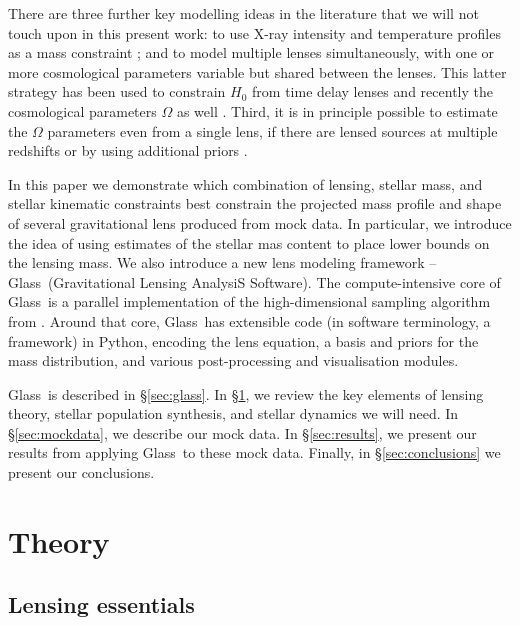 \documentclass[galley,usenatbib]{mn2e}
\newcommand{\Glass}{{\sc Glass}}
\newcommand{\secref}[1] {\S\ref{#1}}
\begin{document}
There are three further key modelling ideas in the literature that we will not
touch upon in this present work: to use X-ray intensity and temperature
profiles as a mass constraint \citep[e.g.][]{2013ApJ...765...25N}; and to model
multiple lenses simultaneously, with one or more cosmological parameters
variable but shared between the lenses. This latter strategy has been used to
constrain $H_0$ from time delay lenses
\citep{2006ApJ...652L...5S,2008ApJ...679...17C,2010ApJ...712.1378P} and
recently the cosmological parameters $\Omega$ as well
\citep{2014MNRAS.437..600S}.  Third, it is in principle possible to estimate
the $\Omega$ parameters even from a single lens, if there are lensed sources at
multiple redshifts \citep{2014MNRAS.437.2461L} or by using additional priors 
\citep{2010Sci...329..924J,2013arXiv1306.4732S}.

In this paper we demonstrate which combination of lensing, stellar mass, and
stellar kinematic constraints best constrain the projected mass profile and
shape of several gravitational lens produced from mock data. In particular,
we introduce the idea of using estimates of the stellar mas content to place
lower bounds on the lensing mass.
We also introduce a new lens modeling framework  -- \Glass\ (Gravitational
Lensing AnalysiS Software). The compute-intensive core of \Glass\ is a parallel
implementation of the high-dimensional sampling algorithm from
\cite{2012MNRAS.425.3077L}.  Around that core, \Glass\ has extensible code (in
software terminology, a framework) in Python, encoding the lens equation, a
basis and priors for the mass distribution, and various post-processing and
visualisation modules.  

\Glass\ is described in \secref{sec:glass}.  In \secref{sec:theory}, we review
the key elements of lensing theory, stellar population synthesis, and stellar
dynamics we will need. In \secref{sec:mockdata}, we describe our mock data. In
\secref{sec:results}, we present our results from applying \Glass\ to these
mock data. Finally, in \secref{sec:conclusions} we present our conclusions. 

\section{Theory}\label{sec:theory}

\subsection{Lensing essentials}\label{sec:lensing_basic}
\end{document}

